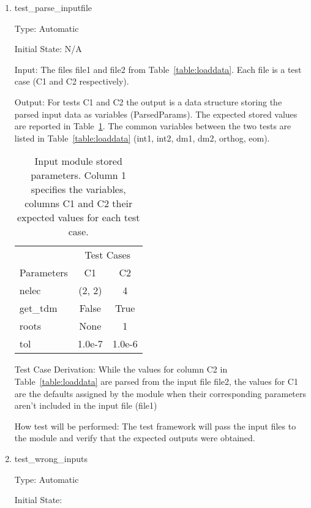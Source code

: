\documentclass[12pt, titlepage]{article}
\begin{document}
\begin{enumerate}
	
	\item{test\_parse\_inputfile}
	
	Type: Automatic
	
	Initial State: N/A
	
	Input: The files file1 and file2 from Table~\ref{table:loaddata}. Each file 
	is a test case (C1 and C2 respectively).

	Output: For tests C1 and C2 the output is a data structure storing the 
	parsed input data as variables (ParsedParams). The expected stored values 
	are reported in Table~\ref{table:loadcases}. The common variables between 
	the two tests are listed in Table~\ref{table:loaddata} (int1, int2, dm1, 
	dm2, orthog, eom).
	\begin{table}[h!]
		\centering
		\begin{tabular}{lcc}
			& \multicolumn{2}{c}{Test Cases} \\
			Parameters             &  C1  &  C2  \\
			nelec                  & (2, 2) & 4  \\
			get\_tdm                 &  False   &  True   \\
			roots                &  None  &  1\\
			tol& 1.0e-7& 1.0e-6\\  
		\end{tabular}
		\caption{Input module stored parameters. Column 1 
			specifies the variables, columns C1 and C2 their expected values 
			for each test case.}
		\label{table:loadcases}
	\end{table}
	
	Test Case Derivation: While the values for column C2 in 
	Table~\ref{table:loaddata} are parsed from the input file file2, the values 
	for C1 are the defaults assigned by the module when their corresponding 
	parameters aren't included in the input file (file1)
	
	How test will be performed: The test framework will pass the input files to 
	the module and verify that the expected outputs were obtained.
	
	\item{test\_wrong\_inputs}
	
	Type: Automatic
	
	Initial State: 
	

\end{enumerate}
\end{document}

